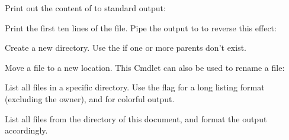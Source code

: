 \begin{flushleft}
	Print out the content of  to standard output:
\end{flushleft}

\begin{flushleft}
\end{flushleft}

\begin{flushleft}
	Print the first ten lines of the file. Pipe the output to  to
	reverse this effect:
\end{flushleft}

\begin{flushleft}
\end{flushleft}

\begin{flushleft}
	Create a new directory. Use the  if one or more parents don't exist.
\end{flushleft}

\begin{flushleft}
\end{flushleft}

\begin{flushleft}
	Move a file to a new location. This Cmdlet can also be used to rename a file:
\end{flushleft}

\begin{flushleft}
\end{flushleft}

\begin{flushleft}
	List all files in a specific directory. Use the  flag for a long listing
	format (excluding the owner), and  for colorful output.
\end{flushleft}

\begin{flushleft}
\end{flushleft}

\begin{flushleft}
	List all  files from the  directory of this document,
	and format the output accordingly.
\end{flushleft}

\begin{flushleft}
\end{flushleft}


